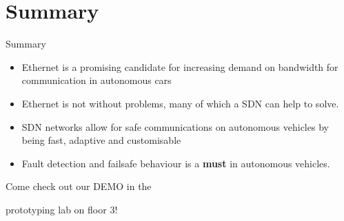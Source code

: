 \documentclass{beamer}
\begin{document}
\section{Summary}
\begin{frame}{Summary}
    \begin{itemize}
        \item Ethernet is a promising candidate for increasing demand on bandwidth for communication in autonomous cars
        \item Ethernet is not without problems, many of which a SDN can help to solve.
        \item SDN networks allow for safe communications on autonomous vehicles by being fast, adaptive and customisable
        \item Fault detection and failsafe behaviour is a \textbf{must} in autonomous vehicles.
    \end{itemize}

\end{frame}


\begin{frame}
    \Huge{\centerline{Come check out our DEMO in the}} 
    \Huge{\centerline{prototyping lab on floor 3!}} 
\end{frame}


        
\end{document}
